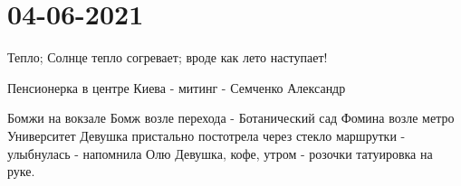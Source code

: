  
 
 
 
 
\section{04-06-2021}

Тепло; Солнце тепло согревает; вроде как лето наступает!

Пенсионерка в центре Киева - митинг - Семченко Александр

Бомжи на вокзале
Бомж возле перехода - Ботанический сад Фомина возле метро Университет
Девушка пристально постотрела через стекло маршрутки - улыбнулась - напомнила Олю
Девушка, кофе, утром - розочки татуировка на руке.


